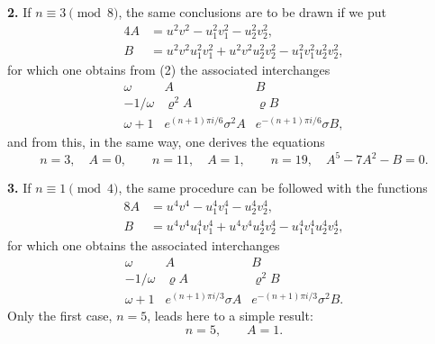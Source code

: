 \documentclass[11pt]{article}
\begin{document}
\noindent\textbf{2.} If $n\equiv3\pmod8$, the same conclusions are to be drawn if we put
\begin{equation}
\begin{aligned}
4A&=u^2v^2-u_1^2v_1^2-u_2^2v_2^2,\\
B&=u^2v^2u_1^2v_1^2+u^2v^2u_2^2v_2^2-u_1^2v_1^2u_2^2v_2^2,
\end{aligned}
\tag{11}
\end{equation}
for which one obtains from (2) the associated interchanges
\begin{equation}
\begin{array}{c|cc}
\omega&A&B\\[0.2em]
-1/\omega&\varrho^2A&\varrho B\\[0.2em]
\omega+1&e^{(n+1)\pi i/6}\sigma^2A&e^{-(n+1)\pi i/6}\sigma B,
\end{array}
\tag{12}
\end{equation}
and from this, in the same way, one derives the equations
\begin{equation}
 n=3,\quad A=0,
 \qquad n=11,\quad A=1,
 \qquad n=19,\quad A^5-7A^2-B=0.
\tag{13}
\end{equation}

\noindent\textbf{3.} If $n\equiv1\pmod4$, the same procedure can be followed with the functions
\begin{equation}
\begin{aligned}
8A&=u^4v^4-u_1^4v_1^4-u_2^4v_2^4,\\
B&=u^4v^4u_1^4v_1^4+u^4v^4u_2^4v_2^4-u_1^4v_1^4u_2^4v_2^4,
\end{aligned}
\tag{14}
\end{equation}
for which one obtains the associated interchanges
\begin{equation}
\begin{array}{c|cc}
\omega&A&B\\[0.2em]
-1/\omega&\varrho A&\varrho^2B\\[0.2em]
\omega+1&e^{(n+1)\pi i/3}\sigma A&e^{-(n+1)\pi i/3}\sigma^2B.
\end{array}
\tag{15}
\end{equation}
Only the first case, $n=5$, leads here to a simple result:
\begin{equation}
 n=5,
 \qquad A=1.
\tag{16}
\end{equation}
\end{document}
